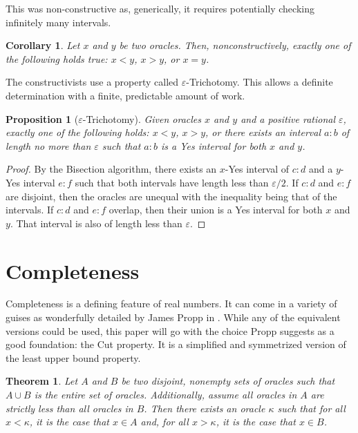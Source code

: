 \documentclass[12pt]{article}
\newtheorem{theorem}{Theorem}[section]
\newtheorem{corollary}{Corollary}[section]
\newtheorem{proposition}{Proposition}[section]
\begin{document}
This was non-constructive as, generically, it requires potentially checking infinitely many intervals. 

\begin{corollary}
    Let $x$ and $y$ be two oracles. Then, nonconstructively, exactly one of the following holds true: $x<y$, $x>y$, or $x=y$.
\end{corollary}

The constructivists use a property called $\varepsilon$-Trichotomy. This allows a definite determination with a finite, predictable amount of work. 

\begin{proposition}[$\varepsilon$-Trichotomy]
    Given oracles $x$ and $y$ and a positive rational $\varepsilon$, exactly one of the following holds: $x<y$, $x>y$, or there exists an interval $a:b$ of length no more than $\varepsilon$ such that $a:b$ is a Yes interval for both $x$ and $y$.
\end{proposition}

\begin{proof}
    By the Bisection algorithm, there exists an $x$-Yes interval of $c:d$ and a $y$-Yes interval $e:f$ such that both intervals have length less than $\varepsilon/2$. If $c:d$ and $e:f$ are disjoint, then the oracles are unequal with the inequality being that of the intervals. If $c:d$ and $e:f$ overlap, then their union is a Yes interval for both $x$ and $y$. That interval is also of length less than $\varepsilon$.
\end{proof}


\section{Completeness}

Completeness is a defining feature of real numbers. It can come in a variety of guises as wonderfully detailed by James Propp in \cite{propp}. While any of the equivalent versions could be used, this paper will go with the choice Propp suggests as a good foundation: the Cut property. It is a simplified and symmetrized version of the least upper bound property. 

\begin{theorem}\label{th:cut}
    Let $A$ and $B$ be two disjoint, nonempty sets of oracles such that $A \cup B$ is the entire set of oracles.  Additionally, assume all oracles in $A$ are strictly less than all oracles in $B$. Then there exists an oracle $\kappa$ such that for all $x < \kappa$, it is the case that $x \in A$ and, for all $x > \kappa$, it is the case that $x \in B$.
\end{theorem}
\end{document}
